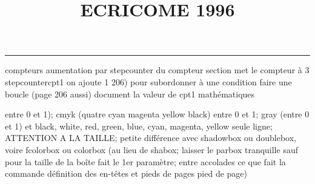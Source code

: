 \documentclass[11pt]{article}%
\title{\bf \vspace{-2cm} ECRICOME 1996} %
\author{} %
\date{} %
\renewcommand{\headrulewidth}{0pt}%
\renewcommand{\footrulewidth}{0.4pt}%
\begin{document}
\maketitle %
\vspace{-1.4cm}\hrule %
\thispagestyle{fancy}

\vspace*{.2cm}



compteurs%
aumentation par stepcounter du compteur section%
met le compteur à 3%
stepcounter{cpt1} on ajoute 1%
206) pour subordonner à une condition %
faire une boucle (page 206 aussi) %
document la valeur de cpt1 
mathématiques\newcommand{\ch}{\operatorname{ch}} 
\newcommand{\sh}{\operatorname{sh}}
\renewcommand{\tanh}{\operatorname{th}}
\renewcommand{\sinh}{\operatorname{sh}}
\renewcommand{\cosh}{\operatorname{ch}}
\newcommand{\argsh}{\operatorname{argsh}}
\newcommand{\argch}{\operatorname{argch}}
\newcommand{\argth}{\operatorname{argth}}
\newcommand{\Id}{\operatorname{Id}}
\renewcommand{\leq}{\leq}
\renewcommand{\geq}{\geq }

\newcommand{\dlim}{\lim}
\newcommand{\dsum}{\sum}
\newcommand{\dint}{\int}
\newcommand{\dprod}{\prod}



entre 0 et 1); cmyk (quatre cyan magenta yellow black) entre 0 et 1;
gray (entre 0 et 1) et black, white, red, green, blue, cyan, magenta,
yellow%
seule ligne; ATTENTION A LA TAILLE; petite différence avec shadowbox ou
doublebox, voire fcolorbox ou colorbox (au lieu de shabox; laisser le
parbox tranquille sauf pour la taille de la boîte
\newcommand{\Tbox}[1]{\begin{center} \shabox{\parbox{0.6
\linewidth}{#1}} \end{center}} %
fait le 1er paramètre; entre accolades ce que fait la commande
définition des en-têtes et pieds de pages\pagestyle{fancy}
\chead{}
\rfoot[ \ \thepage]{\thepage}
\cfoot{}
\lfoot{}
\thispagestyle{fancy} %
pied de page)\renewcommand{\footrulewidth}{0.4pt}
\renewcommand{\headrulewidth}{0.4pt}
\end{document}
